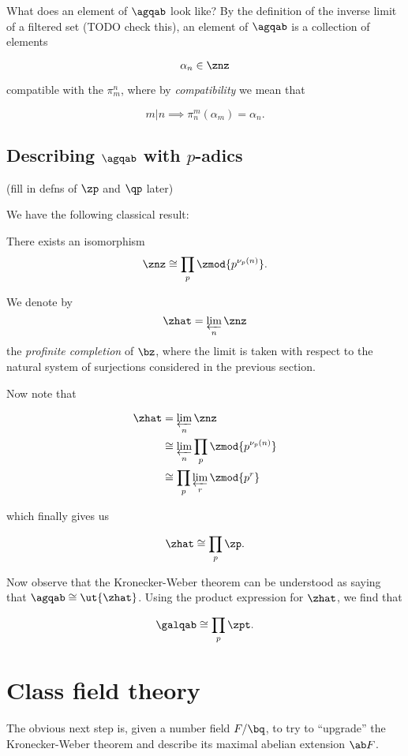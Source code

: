 What does an element of $\agqab$ look like? By the definition of the inverse
limit of a filtered set (TODO check this), an element of $\agqab$ is a collection of
elements

\[ \alpha_n \in \znz \]

compatible with the $\pi_m^n$, where by
\textit{compatibility} we mean that

\[ m|n \implies \pi_n^m(\alpha_m) = \alpha_n. \]

\subsection{Describing $\agqab$ with $p$-adics}
(fill in defns of $\zp$ and $\qp$ later)

We have the following classical result:

\begin{thm}
  There exists an isomorphism
  \[ \znz \cong \prod_p \zmod {p^{\nu_p(n)}}. \]
\end{thm}

\begin{defn}
  We denote by
  \[ \zhat = \varprojlim_n \znz \]
  the \textit{profinite completion} of $\bz$, where the limit is taken with
  respect to the natural system of surjections considered in the previous section.
\end{defn}

Now note that

\begin{align*}
  \zhat &= \varprojlim_n \znz \\
        &\cong \varprojlim_n \prod_p \zmod {p^{\nu_p(n)}} \\
        &\cong \prod_p \varprojlim_r \zmod {p^r}
\end{align*}

which finally gives us

\[ \zhat \cong \prod_p \zp. \]

Now observe that the Kronecker-Weber theorem can be understood as saying that
$\agqab \cong \ut{\zhat}$. Using the product expression for $\zhat$, we find
that

\[ \galqab \cong \prod_p \zpt. \]

\section{Class field theory}
The obvious next step is, given a number field $F/\bq$, to try to ``upgrade''
the Kronecker-Weber theorem and describe its maximal abelian extension $\ab F$.

